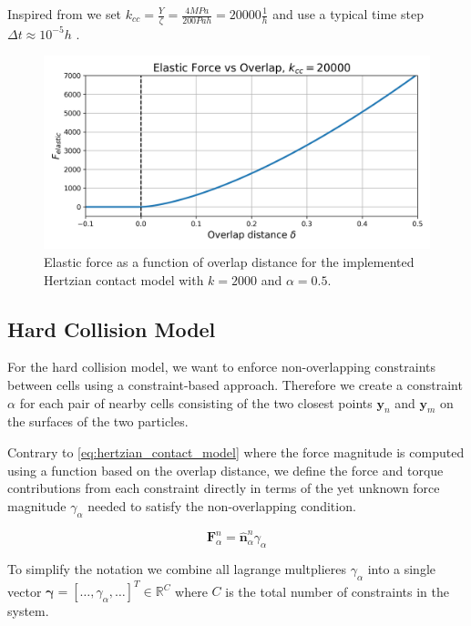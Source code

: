 \documentclass[conference]{IEEEtran}
\begin{document}
Inspired from  \cite{You2018} we set $k_{cc} = \frac{Y}{\zeta} = \frac{4 MPa}{200 Pa h} = 20000 \frac{1}{h}$ and use a typical time step $\Delta t \approx 10^{-5} h$ \cite{Khan_2024}\cite{You2018}\cite{Blanchard2015}.


\begin{figure}[H]
    \centering
    \includegraphics[width=\linewidth]{figures/hertzian_contact_model.png}
    \caption{Elastic force as a function of overlap distance for the implemented Hertzian contact model with $k=2000$ and $\alpha=0.5$.}
    \label{fig:hertzian_contact_model}
\end{figure}

\newpage
\subsection{Hard Collision Model}


For the hard collision model, we want to enforce non-overlapping constraints between cells using a constraint-based approach. Therefore we create a constraint $\alpha$ for each pair of nearby cells consisting of the two closest points $\mathbf{y}_n$ and $\mathbf{y}_m$ on the surfaces of the two particles.

Contrary to \autoref{eq:hertzian_contact_model} where the force magnitude is computed using a function based on the overlap distance, we define the force and torque contributions from each constraint directly in terms of the yet unknown force magnitude $\gamma_\alpha$ needed to satisfy the non-overlapping condition.

\begin{equation}
    \mathbf{F}_\alpha^n = \hat{\mathbf{n}}_\alpha ^n \gamma_\alpha
\end{equation}
\label{eq:constraint_force}

To simplify the notation we combine all lagrange multplieres $\gamma_\alpha$ into a single vector $\boldsymbol{\gamma} = [\dots, \gamma_\alpha, \dots]^T \in \mathbb{R}^{C}$ where $C$ is the total number of constraints in the system.
\end{document}
